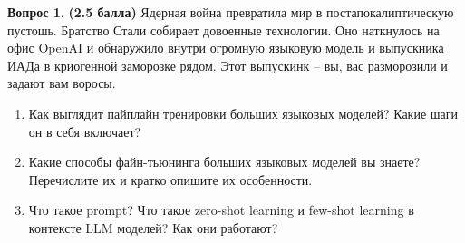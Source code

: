 \documentclass[12pt]{article}
\theoremstyle{definition}
\newtheorem{question}{Вопрос}
\begin{document}
\begin{question} \textbf{(2.5 балла)} \newline
   Ядерная война превратила мир в постапокалиптическую пустошь. Братство Стали собирает довоенные технологии. Оно наткнулось на офис OpenAI и обнаружило внутри огромную языковую модель и выпускника ИАДа в криогенной заморозке рядом. Этот выпускинк -- вы, вас разморозили и задают вам воросы. 
    \begin{enumerate}
        \item Как выглядит пайплайн тренировки больших языковых моделей? Какие шаги он в себя включает? 
        \item Какие способы файн-тьюнинга больших языковых моделей вы знаете? Перечислите их и кратко опишите их особенности.
        \item Что такое prompt? Что такое zero-shot learning и few-shot learning в контексте LLM моделей? Как они работают? 
    \end{enumerate}
\end{question}
\end{document}
